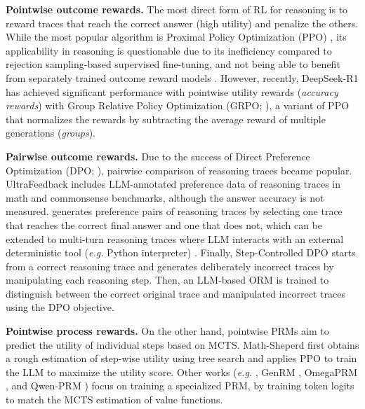 \textbf{Pointwise outcome rewards.} \hspace{0.1cm} The most direct form of RL for reasoning is to reward traces that reach the correct answer (high utility) and penalize the others. While the most popular algorithm is Proximal Policy Optimization (PPO) \citep{schulman2017proximalpolicyoptimizationalgorithms}, its applicability in reasoning is questionable due to its inefficiency compared to rejection sampling-based supervised fine-tuning, and not being able to benefit from separately trained outcome reward models \citep{havrilla2024teachinglargelanguagemodels}. However, recently, DeepSeek-R1 \citep{deepseekai2025deepseekr1incentivizingreasoningcapability} has achieved significant performance with pointwise utility rewards (\textit{accuracy rewards}) with Group Relative Policy Optimization (GRPO; \citet{shao2024deepseekmathpushinglimitsmathematical}), a variant of PPO that normalizes the rewards by subtracting the average reward of multiple generations (\textit{groups}).

\textbf{Pairwise outcome rewards.} \hspace{0.1cm} Due to the success of Direct Preference Optimization (DPO; \citet{NEURIPS2023_a85b405e}), pairwise comparison of reasoning traces became popular. UltraFeedback \citep{cui2024ultrafeedbackboostinglanguagemodels} includes LLM-annotated preference data of reasoning traces in math and commonsense benchmarks, although the answer accuracy is not measured. \citet{pang2024iterativereasoningpreferenceoptimization} generates preference pairs of reasoning traces by selecting one trace that reaches the correct final answer and one that does not, which can be extended to multi-turn reasoning traces where LLM interacts with an external deterministic tool (\textit{e.g.} Python interpreter) \citet{xiong2024buildingmathagentsmultiturn}. Finally, Step-Controlled DPO \citep{lu2024stepcontrolleddpoleveragingstepwise} starts from a correct reasoning trace and generates deliberately incorrect traces by manipulating each reasoning step. Then, an LLM-based ORM is trained to distinguish between the correct original trace and manipulated incorrect traces using the DPO objective.

\textbf{Pointwise process rewards.} \hspace{0.1cm} On the other hand, pointwise PRMs aim to predict the utility of individual steps based on MCTS. Math-Sheperd \citep{wang-etal-2024-math} first obtains a rough estimation of step-wise utility using tree search and applies PPO to train the LLM to maximize the utility score. Other works (\textit{e.g.} \citet{DBLP:conf/iclr/LightmanKBEBLLS24}, GenRM \citep{zhang2024generativeverifiersrewardmodeling}, OmegaPRM \citep{luo2024improvemathematicalreasoninglanguage}, and Qwen-PRM \citep{zhang2025lessonsdevelopingprocessreward}) focus on training a specialized PRM, by training token logits to match the MCTS estimation of value functions.


